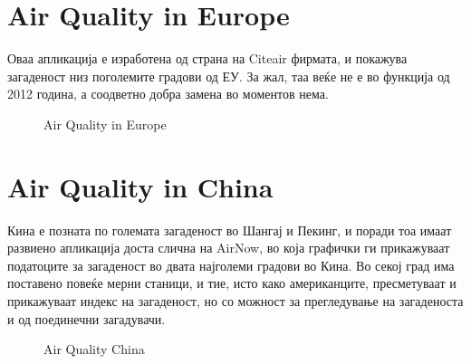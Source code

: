 \documentclass{uvamscse}
\begin{document}
\section{Air Quality in Europe}
Оваа апликација е изработена од страна на Citeair фирмата, и покажува загаденост низ поголемите градови од ЕУ. За жал, таа веќе не е во функција од 2012 година, а соодветно добра замена во моментов нема.
\begin{figure}[H]
\centering
  \caption{Air Quality in Europe}
  \label{fig:aireu}
\end{figure}
\vspace{5mm}

\section{Air Quality in China}
Кина е позната по големата загаденост во Шангај и Пекинг, и поради тоа имаат развиено апликација доста слична на AirNow, во која графички ги прикажуваат податоците за загаденост во двата најголеми градови во Кина. Во секој град има поставено повеќе мерни станици, и тие, исто како американците, пресметуваат и прикажуваат индекс на загаденост, но со можност за прегледување на загаденоста и од поединечни загадувачи.
\begin{figure}[H]
\centering
  \caption{Air Quality China}
  \label{fig:airch}
\end{figure}
\end{document}
